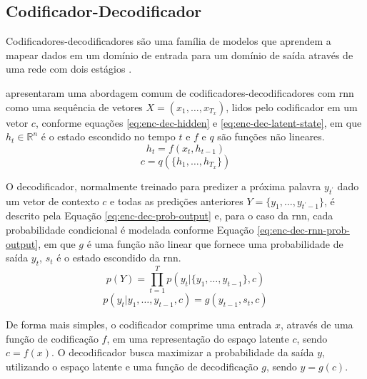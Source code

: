 \subsection{Codificador-Decodificador}
\label{sec:encoder-decoder}

Codificadores-decodificadores são uma família de modelos que aprendem a mapear dados em um domínio de entrada para um domínio de saída através de uma rede com dois estágios \cite{Minaee2020Image}.

\textcite{Bahdanau2016Neural} apresentaram uma abordagem comum de codificadores-decodificadores com \gls{rnn} como uma sequência de vetores $X = (x_1, \dots, x_{T_x})$, lidos pelo codificador em um vetor $c$, conforme equações \ref{eq:enc-dec-hidden} e \ref{eq:enc-dec-latent-state}, em que $h_t \in \mathbb{R}^n$ é o estado escondido no tempo $t$ e $f$ e $q$ são funções não lineares.
\begin{equation}
    \label{eq:enc-dec-hidden}
    h_t = f(x_t, h_{t-1})
\end{equation}
\begin{equation}
    \label{eq:enc-dec-latent-state}
    c = q(\{ h_1, \dots, h_{T_x} \})
\end{equation}

O decodificador, normalmente treinado para predizer a próxima palavra $y_{t^\prime}$ dado um vetor de contexto $c$ e todas as predições anteriores $Y = \{y_1, \dots, y_{t^\prime - 1}\}$, é descrito pela Equação \ref{eq:enc-dec-prob-output} e, para o caso da \gls{rnn}, cada probabilidade condicional é modelada conforme Equação \ref{eq:enc-dec-rnn-prob-output}, em que $g$ é uma função não linear que fornece uma probabilidade de saída $y_t$, $s_t$ é o estado escondido da \gls{rnn}.
\begin{equation}
    \label{eq:enc-dec-prob-output}
    p(Y) = \prod_{t=1}^{T} p(y_t | \{ y_1, \dots, y_{t-1} \}, c)
\end{equation}
\begin{equation}
    \label{eq:enc-dec-rnn-prob-output}
    p(y_t | {y_1, \dots, y_{t-1}}, c) = g(y_{t-1}, s_t, c)
\end{equation}

De forma mais simples, o codificador comprime uma entrada $x$, através de uma função de codificação $f$, em uma representação do espaço latente $c$, sendo $c = f(x)$. O decodificador busca maximizar a probabilidade da saída $y$, utilizando o espaço latente e uma função de decodificação $g$, sendo $y = g(c)$.

